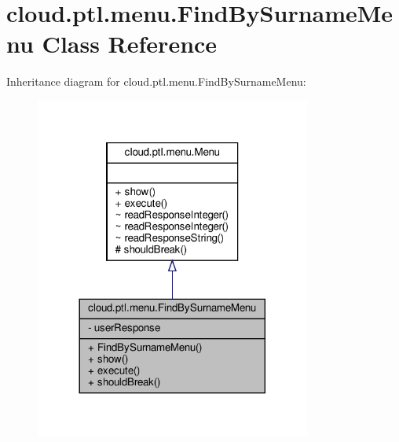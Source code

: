 \hypertarget{classcloud_1_1ptl_1_1menu_1_1FindBySurnameMenu}{}\section{cloud.\+ptl.\+menu.\+Find\+By\+Surname\+Menu Class Reference}
\label{classcloud_1_1ptl_1_1menu_1_1FindBySurnameMenu}


Inheritance diagram for cloud.\+ptl.\+menu.\+Find\+By\+Surname\+Menu\+:
\nopagebreak
\begin{figure}[H]
\begin{center}
\leavevmode
\includegraphics[width=257pt]{classcloud_1_1ptl_1_1menu_1_1FindBySurnameMenu__inherit__graph}
\end{center}
\end{figure}


